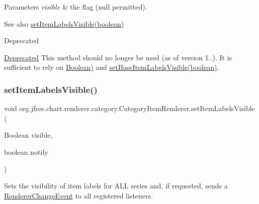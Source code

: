 \begin{DoxyParams}{Parameters}
{\em visible} & the flag ({\ttfamily null} permitted).\\
\hline
\end{DoxyParams}
\begin{DoxySeeAlso}{See also}
\mbox{\hyperlink{interfaceorg_1_1jfree_1_1chart_1_1renderer_1_1category_1_1_category_item_renderer_af9ce871487627fca00bd5b7b4ddc6306}{set\+Item\+Labels\+Visible(boolean)}}
\end{DoxySeeAlso}
\begin{DoxyRefDesc}{Deprecated}
\item[\mbox{\hyperlink{deprecated__deprecated000165}{Deprecated}}]This method should no longer be used (as of version 1..). It is sufficient to rely on \mbox{\hyperlink{}{Boolean)}} and \mbox{\hyperlink{interfaceorg_1_1jfree_1_1chart_1_1renderer_1_1category_1_1_category_item_renderer_ac6695ccdc953127606d151a4b17f70a7}{set\+Base\+Item\+Labels\+Visible(boolean)}}. \end{DoxyRefDesc}
\mbox{\label{interfaceorg_1_1jfree_1_1chart_1_1renderer_1_1category_1_1_category_item_renderer_a67bf770b8f51b4d493c89749e976d1da}} 
\subsubsection{\texorpdfstring{set\+Item\+Labels\+Visible()}{setItemLabelsVisible()}\hspace{0.1cm}{\footnotesize\ttfamily [3/3]}}
{\footnotesize\ttfamily void org.\+jfree.\+chart.\+renderer.\+category.\+Category\+Item\+Renderer.\+set\+Item\+Labels\+Visible (\begin{DoxyParamCaption}\item[{Boolean}]{visible,  }\item[{boolean}]{notify }\end{DoxyParamCaption})}

Sets the visibility of item labels for A\+LL series and, if requested, sends a \mbox{\hyperlink{}{Renderer\+Change\+Event}} to all registered listeners.


